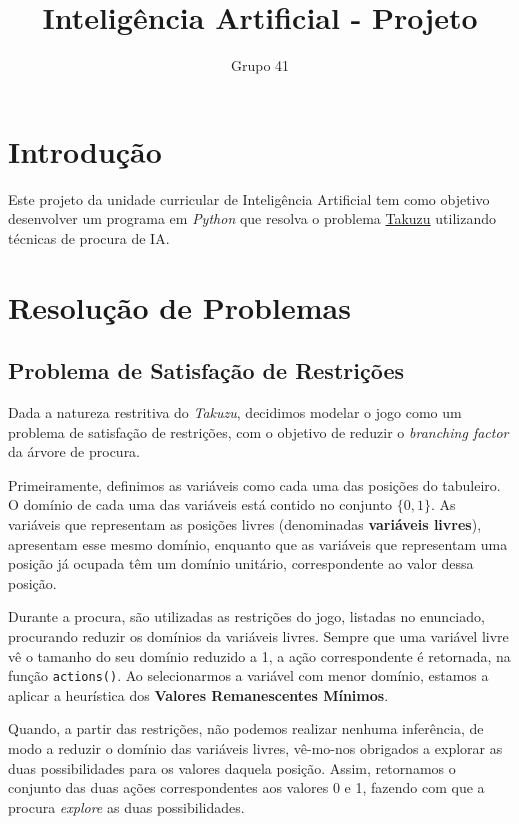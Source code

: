 \documentclass[12pt]{article}
\title{Inteligência Artificial - Projeto}
\author{Grupo 41}
\date{}
\begin{document}
\maketitle


\section{Introdução}
Este projeto da unidade curricular de Inteligência Artificial tem como objetivo
desenvolver um programa em \emph{Python} que resolva o problema
\href{https://en.wikipedia.org/wiki/Takuzu}{Takuzu} utilizando técnicas de
procura de IA.

\section{Resolução de Problemas}
\subsection{Problema de Satisfação de Restrições}
Dada a natureza restritiva do \emph{Takuzu}, decidimos modelar o jogo como um
problema de satisfação de restrições, com o objetivo de reduzir o
\emph{branching factor} da árvore de procura.

Primeiramente, definimos as variáveis como cada uma das posições do tabuleiro.
O domínio de cada uma das variáveis está contido no conjunto $\{0, 1\}$.
As variáveis que representam as posições livres (denominadas
\textbf{variáveis livres}), apresentam esse mesmo domínio, enquanto que as
variáveis que representam uma posição já ocupada têm um domínio unitário,
correspondente ao valor dessa posição.

Durante a procura, são utilizadas as restrições do jogo, listadas no enunciado,
procurando reduzir os domínios da variáveis livres. Sempre que uma variável
livre vê o tamanho do seu domínio reduzido a 1, a ação correspondente é retornada,
na função \texttt{actions()}. Ao selecionarmos a variável com menor domínio,
estamos a aplicar a heurística dos \textbf{Valores Remanescentes Mínimos}.

Quando, a partir das restrições, não podemos realizar nenhuma inferência, de
modo a reduzir o domínio das variáveis livres, vê-mo-nos obrigados a explorar as
duas possibilidades para os valores daquela posição. Assim, retornamos o
conjunto das duas ações correspondentes aos valores 0 e 1, fazendo com que a
procura \emph{explore} as duas possibilidades.
\end{document}
